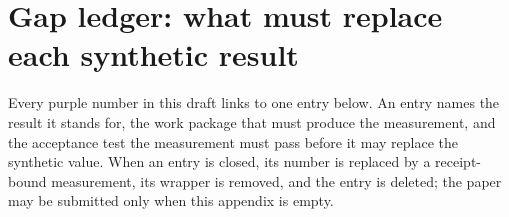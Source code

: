 \section{Gap ledger: what must replace each synthetic result}
\label{app:gaps}

Every purple number in this draft links to one entry below. An entry names the result it stands
for, the work package that must produce the measurement, and the acceptance test the measurement
must pass before it may replace the synthetic value. When an entry is closed, its number is replaced
by a receipt-bound measurement, its  wrapper is removed, and the entry is
deleted; the paper may be submitted only when this appendix is empty.

\newcommand\gapentry[7]{%
  \par\smallskip\noindent\hypertarget{gap.#1}{}%
  \begin{tcolorbox}[enhanced, breakable, colback=ezsynsoft, colframe=ezsynsoft, arc=1.5pt,
      left=7pt, right=7pt, top=4pt, bottom=4pt, before skip=3pt, after skip=3pt, fontupper=\small]
  {\sffamily\sbseries\color{ezsyn}#1}\quad{\sffamily\sbseries #2}\hfill{\sffamily\footnotesize\color{ezgrey}#3}\par
  {\footnotesize\sffamily
  \textcolor{ezgrey}{Replaces}\enspace #6\par
  \textcolor{ezgrey}{Work}\enspace #4\par
  \textcolor{ezgrey}{Acceptance}\enspace #5\par
  \textcolor{ezgrey}{Claims}\enspace #7}
  \end{tcolorbox}}


